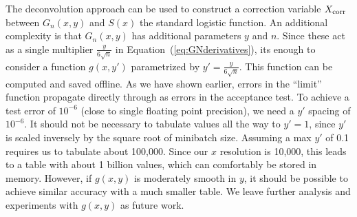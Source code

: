 \documentclass{article}
\begin{document}
The deconvolution approach can be used to construct a correction variable
$X_{\rm corr}$ between $G_n(x,y)$ and $S(x)$ the standard logistic function. An
additional complexity is that $G_n(x,y)$ has additional parameters $y$ and $n$.
Since these act as a single multiplier $\frac{y}{6\sqrt{n}}$ in
Equation~(\ref{eq:GNderivatives}), its enough to consider a function $g(x,y')$
parametrized by $y'= \frac{y}{6\sqrt{n}}$. This function can be computed and
saved offline. As we have shown earlier, errors in the ``limit'' function
propagate directly through as errors in the acceptance test.  To achieve a test
error of $10^{-6}$ (close to single floating point precision), we need a $y'$
spacing of $10^{-6}$. It should not be necessary to tabulate values all the way to
$y'=1$, since $y'$ is scaled inversely by the square root of minibatch size.
Assuming a max $y'$ of 0.1 requires us to tabulate about 100,000.  Since our $x$
resolution is 10,000, this leads to a table with about 1 billion values, which
can comfortably be stored in memory.  However, if $g(x,y)$ is moderately smooth
in $y$, it should be possible to achieve similar accuracy with a much smaller
table. We leave further analysis and experiments with $g(x,y)$ as future work.
\end{document}
